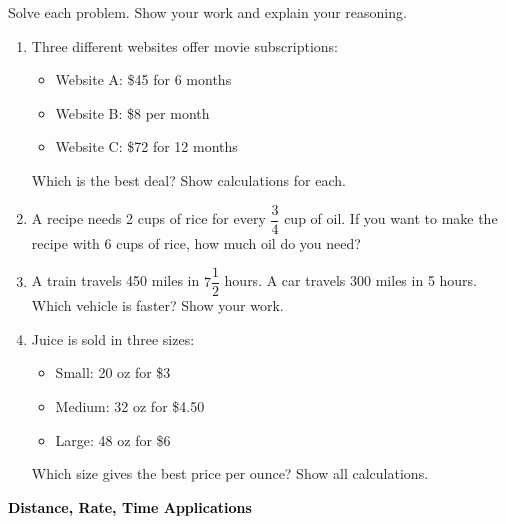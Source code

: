 \documentclass[12pt, letterpaper, fleqn]{article}
\begin{document}
\noindent
Solve each problem. Show your work and explain your reasoning.

\vspace{3mm}

\begin{enumerate}[itemsep=2.3cm, leftmargin=0.6cm]

\item Three different websites offer movie subscriptions:
\begin{itemize}
    \item Website A: \$45 for 6 months
    \item Website B: \$8 per month
    \item Website C: \$72 for 12 months
\end{itemize}
Which is the best deal? Show calculations for each.
\vspace{3cm}

\item A recipe needs 2 cups of rice for every $\dfrac{3}{4}$ cup of oil. If you want to make the recipe with 6 cups of rice, how much oil do you need?
\vspace{2.3cm}

\newpage
\item A train travels 450 miles in $7\dfrac{1}{2}$ hours. A car travels 300 miles in 5 hours. Which vehicle is faster? Show your work.
\vspace{4cm}

\item Juice is sold in three sizes:
\begin{itemize}
    \item Small: 20 oz for \$3
    \item Medium: 32 oz for \$4.50
    \item Large: 48 oz for \$6
\end{itemize}
Which size gives the best price per ounce? Show all calculations.
\vspace{3.5cm}

\end{enumerate}

\newpage

\begin{tcolorbox}[colback=customteal!20]
\large\textcolor{black}{\textbf{Distance, Rate, Time Applications}}
\end{tcolorbox}
\end{document}

